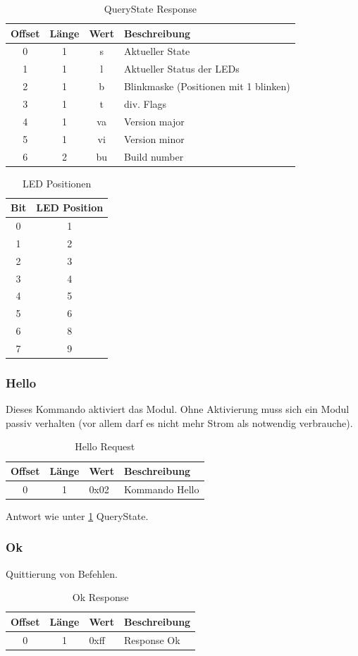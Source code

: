 \documentclass[10pt,a4paper]{article}
\begin{document}
\begin{table}[H]
\label{QUERYSTATE_RESP}
\centering
\begin{tabular}{c|c|c|l}
\textbf{Offset} & \textbf{Länge} & \textbf{Wert} & \textbf{Beschreibung} \\ \hline
0 & 1 & s & Aktueller State\\
1 & 1 & l & Aktueller Status der LEDs\\
2 & 1 & b & Blinkmaske (Positionen mit 1 blinken)\\
3 & 1 & t & div. Flags\\
4 & 1 & va & Version major\\
5 & 1 & vi & Version minor\\
6 & 2 & bu & Build number
\end{tabular}
\caption{QueryState Response}
\end{table}

\begin{table}[H]
\centering
\begin{tabular}{c|c}
\label{POSMASK}
\textbf{Bit} & \textbf{LED Position} \\ \hline
0 & 1 \\
1 & 2 \\
2 & 3 \\
3 & 4 \\
4 & 5 \\
5 & 6 \\
6 & 8 \\
7 & 9
\end{tabular}
\caption{LED Positionen}
\end{table}


\subsubsection{Hello}
\label{sec:Hello}
Dieses Kommando aktiviert das Modul. Ohne Aktivierung muss sich ein Modul passiv verhalten (vor allem darf es nicht mehr Strom als notwendig verbrauche).
\begin{table}[H]
\centering
\begin{tabular}{c|c|l|l}
\textbf{Offset} & \textbf{Länge} & \textbf{Wert} & \textbf{Beschreibung} \\ \hline
0 & 1 & 0x02 & Kommando Hello 
\end{tabular}
\caption{Hello Request}
\end{table}
Antwort wie unter \ref{QUERYSTATE_RESP} QueryState.

\subsubsection{Ok}
\label{sec:Ok}
Quittierung von Befehlen.
\begin{table}[H]
\centering
\begin{tabular}{c|c|l|l}
\textbf{Offset} & \textbf{Länge} & \textbf{Wert} & \textbf{Beschreibung} \\ \hline
0 & 1 & 0xff & Response Ok
\end{tabular}
\caption{Ok Response}
\end{table}
\end{document}
